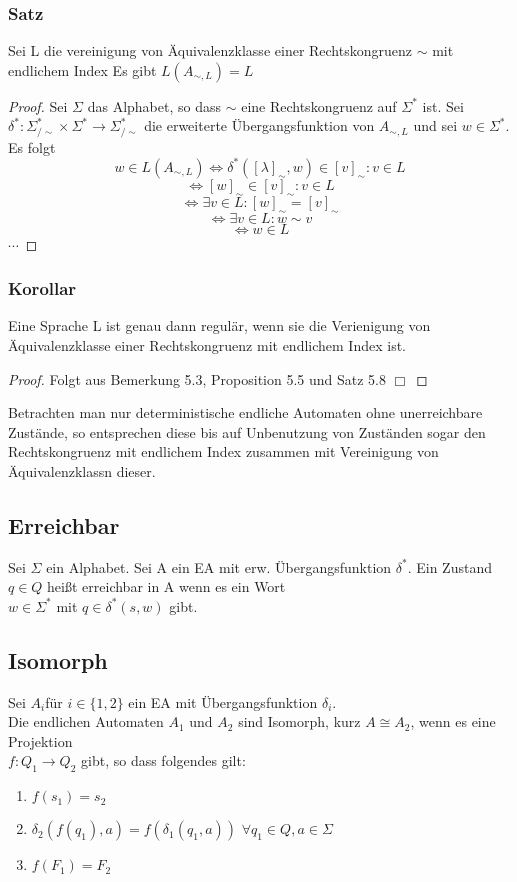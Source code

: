 \subsubsection*{Satz} Sei L die vereinigung von Äquivalenzklasse einer Rechtskongruenz $\sim$ mit endlichem Index Es gibt $L(A_{\sim, L}) = L$ 
\begin{proof}
  Sei $\Sigma$ das Alphabet, so dass $\sim$ eine Rechtskongruenz auf $\Sigma^{*}$ ist. Sei $\delta^{*} : \Sigma^{*}_{/\sim} \times \Sigma^{*} \rightarrow \Sigma^{*}_{/\sim}$ die erweiterte Übergangsfunktion von $A_{\sim, L}$ und sei $w \in \Sigma^{*}$. Es folgt 
  \[w \in L(A_{\sim, L}) \Leftrightarrow \delta^{*}([\lambda]_{\sim}, w) \in {[v]_{\sim} : v \in L}\]
  \[\Leftrightarrow [w]_{\sim} \in {[v]_{\sim} : v\in L}\]
  \[\Leftrightarrow \exists v \in L : [w]_{\sim} = [v]_{\sim}\]
  \[\Leftrightarrow \exists v \in L : w \sim v\]
  \[\Leftrightarrow w \in L\]
  $\cdots$    
\end{proof}

\subsubsection*{Korollar} Eine Sprache L ist genau dann regulär, wenn sie die Verienigung von Äquivalenzklasse einer Rechtskongruenz mit endlichem Index ist. 
\begin{proof}
  Folgt aus Bemerkung 5.3, Proposition 5.5 und Satz 5.8 $\Box$ 
\end{proof}
Betrachten man nur deterministische endliche Automaten ohne unerreichbare Zustände, so entsprechen diese bis auf Unbenutzung von Zuständen sogar den Rechtskongruenz mit endlichem Index zusammen mit Vereinigung von Äquivalenzklassn dieser.
\subsection{Erreichbar}
    Sei \(\Sigma\) ein Alphabet. Sei A ein EA mit erw. Übergangsfunktion \(\delta^*\). 
    Ein Zustand \(q\in Q\) heißt erreichbar in A wenn es ein Wort \\
    \(w\in\Sigma^*\) mit \(q\in\delta^*(s,w)\) gibt.
\subsection{Isomorph}
    Sei \(A_i\)für \(i\in\{1,2\}\) ein EA mit Übergangsfunktion \(\delta_i\).\\
    Die endlichen Automaten \(A_1\) und \(A_2\) sind Isomorph, kurz \(A\cong A_2 \), wenn es eine Projektion \\ \(f:Q_1\to Q_2\) gibt, so dass folgendes gilt:
    \begin{enumerate}
        \item \(f(s_1)=s_2\)
        \item \(\delta_2(f(q_1),a)=f(\delta_1(q_1,a))\) \(\forall q_1\in Q,a\in\Sigma\)
        \item \(f(F_1)=F_2\)
    \end{enumerate}
